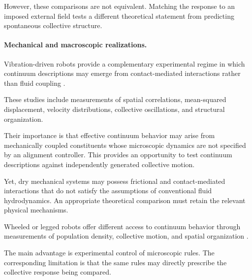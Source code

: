 However, these comparisons are not
equivalent. Matching the response
to an imposed external field
tests a different theoretical
statement from predicting
spontaneous collective structure.

\paragraph*{Mechanical and macroscopic realizations.}

Vibration-driven robots provide a complementary
experimental regime in which continuum descriptions
may emerge from contact-mediated interactions
rather than fluid coupling
\cite{Scholz2018rotatingrobotsmove,Arbel2025amechanicalroutef,Baconnier2022selectiveandcollec,Casiulis2025ageometricconditio,Deblais2018boundariescontrolc,Boudet2022effectivetemperatur,Wang2025hyperuniformnetwork,Miyashita2007selfassembleofwat,Mayya2019nonuniformrobotde,Li2021programmingactivec,Zion2023morphologicalcomput,Wagner2026geometryinducedtra,Lvay2026collectivedynamics,Zion2021distributedonline}.

These studies include measurements
of spatial correlations,
mean-squared displacement,
velocity distributions,
collective oscillations,
and structural organization.

Their importance is that effective
continuum behavior may arise
from mechanically coupled
constituents whose microscopic
dynamics are not specified
by an alignment controller.
This provides an opportunity
to test continuum descriptions
against independently generated
collective motion.

Yet, dry mechanical systems
may possess frictional
and contact-mediated
interactions that do not
satisfy the assumptions
of conventional fluid
hydrodynamics. An appropriate
theoretical comparison
must retain the relevant
physical mechanisms.

Wheeled or legged robots offer
different access to continuum
behavior through measurements
of population density,
collective motion,
and spatial organization
\cite{Giardina2022collectivephototact,Fersula2026aggregatingswarmst,Valentini2015collectivedecision,Zhou2024anticipationpromote,Hamann2008spatialmacroscopic,Maffettone2024mixedrealityenviro,Aguilar2018collectiveclogcont,Kernbach2013adaptivecollective,Arvin2011imitationofhoneybe,Prasath2022dynamicsofcooperat,Fruchart2020phasetransitionsin}.

The main advantage is experimental control
of microscopic rules. The corresponding
limitation is that the same rules may
directly prescribe the collective
response being compared.

